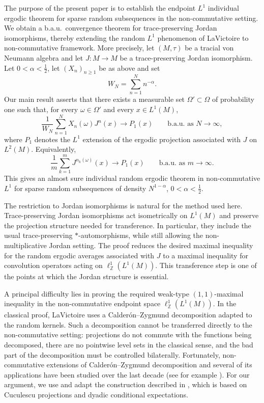 \documentclass[12pt]{amsart}
\theoremstyle{remark}
\theoremstyle{definition}
\numberwithin{equation}{section}
\begin{document}
The purpose of the present paper is to establish the endpoint \(L^1\) individual ergodic theorem for sparse random subsequences in the non-commutative setting. We obtain a b.a.u.\ convergence theorem for trace-preserving Jordan isomorphisms, thereby extending the random \(L^1\) phenomenon of LaVictoire to non-commutative framework. More precisely, let $(M,\tau)$ be a tracial von Neumann
algebra and let $J\colon M\to M$ be a trace-preserving Jordan isomorphism. Let
$0<\alpha<\frac12$, let $(X_n)_{n\geq 1}$ be as above and
set
\[
   W_N=\sum_{n=1}^N n^{-\alpha}.
\]
Our main result asserts that there exists
a measurable set $\Omega'\subset\Omega$ of 
probability one such that, for
every $\omega\in\Omega'$ and every $x\in L^1(M)$,
\[
   \frac{1}{W_N}\sum_{n=1}^N X_n(\omega)J^n(x)
   \longrightarrow P_1(x)
   \qquad\text{b.a.u.\ as }N\to\infty,
\]
where $P_1$ denotes the $L^1$ extension of the ergodic projection
associated with $J$ on $L^2(M)$. Equivalently, 
\[
   \frac{1}{m}\sum_{k=1}^m J^{n_k(\omega)}(x)
   \longrightarrow P_1(x)
   \qquad\text{b.a.u.\ as }m\to\infty.
\]
This gives an almost sure individual random ergodic theorem in
non-commutative $L^1$ for sparse random subsequences of density
$N^{1-\alpha}$, $0<\alpha<\frac12$.




The restriction to Jordan isomorphisms is natural for the method used here.
Trace-preserving Jordan isomorphisms act isometrically on $L^1(M)$ and
preserve the projection structure needed for transference. In particular,
they include the usual trace-preserving $\ast$-automorphisms, while still
allowing the non-multiplicative Jordan setting. The proof reduces the desired
maximal inequality for the random ergodic averages associated with $J$ to a
maximal inequality for convolution operators acting on
$\ell^1_{\mathbb Z}(L^1(M))$. This transference step is one of the points at
which the Jordan structure is essential.

A principal difficulty lies in proving the required weak-type $(1,1)$-maximal 
inequality in the non-commutative endpoint space 
$\ell^1_{\mathbb Z}(L^1(M))$. In the classical
proof, LaVictoire uses a Calder\'on--Zygmund decomposition adapted to the
random kernels. Such a decomposition cannot be transferred directly to the
non-commutative setting: projections do not commute with the functions being
decomposed, there are no pointwise level sets in the classical sense, and the
bad part of the decomposition must be controlled bilaterally.
Fortunately, non-commutative extensions of Calder\'on--Zygmund decomposition 
and several of its applications have been studied over the last decade (see for example \cite{P,CCAP,HLX}). 
For our argument, we use and adapt the construction described in \cite{CCAP}, which is based on
Cuculescu projections \cite{C} and dyadic conditional expectations.
\end{document}

